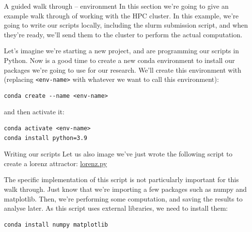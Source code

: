 \documentclass[10pt]{beamer}
\begin{document}
\begin{frame}[label={sec:org40fc931},fragile]{A guided walk through -- environment}
 In this section we're going to give an example walk through of working with the
HPC cluster. In this example, we're going to write our scripts locally,
including the slurm submission script, and when they're ready, we'll send them
to the cluster to perform the actual computation.

Let's imagine we're starting a new project, and are programming our scripts in
Python. Now is a good time to create a new conda environment to install our
packages we're going to use for our research. We'll create this environment with
(replacing \texttt{<env-name>} with whatever we want to call this environment):

\begin{verbatim}
conda create --name <env-name>
\end{verbatim}

and then activate it:

\begin{verbatim}
conda activate <env-name>
conda install python=3.9
\end{verbatim}
\end{frame}

\begin{frame}[label={sec:org3e11dcf},fragile]{Writing our scripts}
 Let us also image we've just wrote the following script to create a lorenz
attractor: \href{https://pageperso.lis-lab.fr/jay.morgan/resources/2021-programming-level-up/lectures/week-5/lorenz.py}{lorenz.py}

The specific implementation of this script is not particularly important for
this walk through. Just know that we're importing a few packages such as numpy
and matplotlib. Then, we're performing some computation, and saving the results
to analyse later. As this script uses external libraries, we need to install
them:

\begin{verbatim}
conda install numpy matplotlib
\end{verbatim}
\end{frame}
\end{document}

